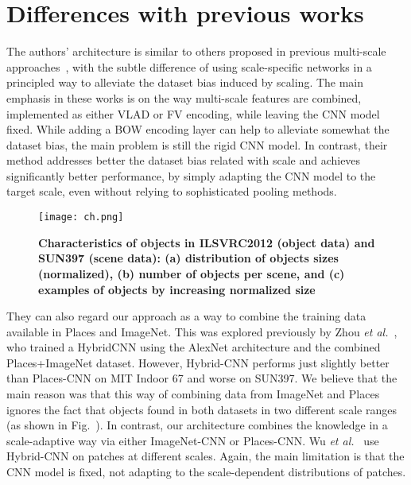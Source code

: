 \documentclass[10pt,twocolumn,letterpaper]{article}
\begin{document}
\section{Differences with previous works}
 The authors' architecture is similar to others proposed in previous multi-scale approaches~\cite{name4,name21,name1}, with the subtle difference of using scale-specific networks in a principled way to alleviate the dataset bias induced by scaling. The main emphasis in these works is on the way multi-scale features are combined, implemented as either VLAD or FV encoding, while leaving the CNN model fixed. While adding a BOW encoding layer can help to alleviate somewhat the dataset bias, the main problem is still the rigid CNN model. In contrast, their method addresses better the dataset bias related with scale and achieves significantly better performance, by simply adapting the CNN model to the target scale, even without relying to sophisticated pooling methods.
\begin{figure}[!htb]
 \centering
 \texttt{[image: ch.png]}\\
 \caption{ \textbf{ Characteristics of objects in ILSVRC2012 (object data) and SUN397 (scene data): (a) distribution of objects sizes (normalized), (b) number of objects per scene, and (c) examples of objects by increasing normalized size}}\label{Figure1}
 \end{figure}
 \par They can also regard our approach as a way to combine the training data available in Places and ImageNet. This was explored previously by Zhou \emph{et al.}~\cite{name23}, who trained a HybridCNN using the AlexNet architecture and the combined Places+ImageNet dataset. However, Hybrid-CNN performs just slightly better than Places-CNN on MIT Indoor 67 and worse on SUN397. We believe that the main reason was that this way of combining data from ImageNet and Places ignores the fact that objects found in both datasets in two different scale ranges (as shown in Fig.~\cite{name1}). In contrast, our architecture combines the knowledge in a scale-adaptive way via either ImageNet-CNN or Places-CNN. Wu \emph{et al.}~\cite{name16} use Hybrid-CNN on patches at different scales. Again, the main limitation is that the CNN model is fixed, not adapting to the scale-dependent distributions of patches.
\end{document}
